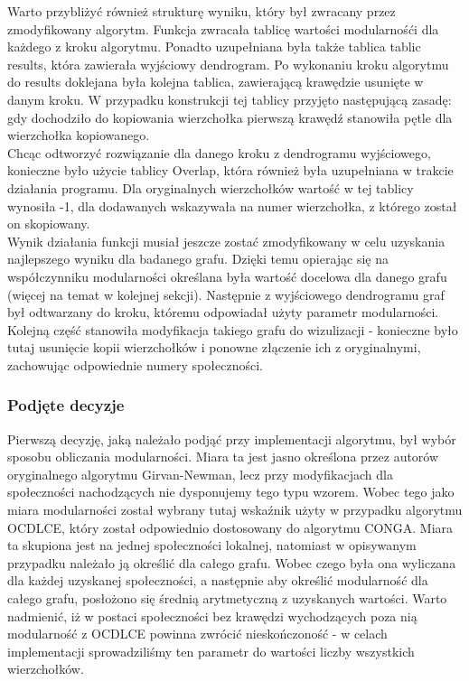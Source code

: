 \documentclass{article}
\begin{document}
Warto przybliżyć również strukturę wyniku, który był zwracany przez zmodyfikowany algorytm. Funkcja zwracała tablicę wartości modularnośći dla każdego z kroku algorytmu. Ponadto uzupełniana była także tablica tablic results, która zawierała wyjściowy dendrogram. Po wykonaniu kroku algorytmu do results doklejana była kolejna tablica, zawierającą krawędzie usunięte w danym kroku. W przypadku konstrukcji tej tablicy przyjęto następującą zasadę: gdy dochodziło do kopiowania wierzchołka pierwszą krawędź stanowiła pętle dla wierzchołka kopiowanego.\\

Chcąc odtworzyć rozwiązanie dla danego kroku z dendrogramu wyjściowego, konieczne było użycie tablicy Overlap, która również była uzupełniana w trakcie działania programu. Dla oryginalnych wierzchołków wartość w tej tablicy wynosiła -1, dla dodawanych wskazywała na numer wierzchołka, z którego został on skopiowany.\\

Wynik działania funkcji musiał jeszcze zostać zmodyfikowany w celu uzyskania najlepszego wyniku dla badanego grafu. Dzięki temu opierając się na współczynniku modularności określana była wartość docelowa dla danego grafu (więcej na temat w kolejnej sekcji). Następnie z wyjściowego dendrogramu graf był odtwarzany do kroku, któremu odpowiadał użyty parametr modularności. Kolejną część stanowiła modyfikacja takiego grafu do wizulizacji - konieczne było tutaj usunięcie kopii wierzchołków i ponowne złączenie ich z oryginalnymi, zachowując odpowiednie numery społeczności.

\subsubsection{Podjęte decyzje}
Pierwszą decyzję, jaką należało podjąć przy implementacji algorytmu, był wybór sposobu obliczania modularności. Miara ta jest jasno określona przez autorów oryginalnego algorytmu Girvan-Newman, lecz przy modyfikacjach dla społeczności nachodzących nie dysponujemy tego typu wzorem. Wobec tego jako miara modularności został wybrany tutaj wskaźnik użyty w przypadku algorytmu OCDLCE, który został odpowiednio dostosowany do algorytmu CONGA. Miara ta skupiona jest na jednej społeczności lokalnej, natomiast w opisywanym przypadku należało ją określić dla całego grafu. Wobec czego była ona wyliczana dla każdej uzyskanej społeczności, a następnie aby określić modularność dla całego grafu, posłożono się średnią arytmetyczną z uzyskanych wartości. Warto nadmienić, iż w postaci społeczności bez krawędzi wychodzących poza nią modularność z OCDLCE powinna zwrócić nieskończoność - w celach implementacji sprowadziliśmy ten parametr do wartości liczby wszystkich wierzchołków.\\
\end{document}
